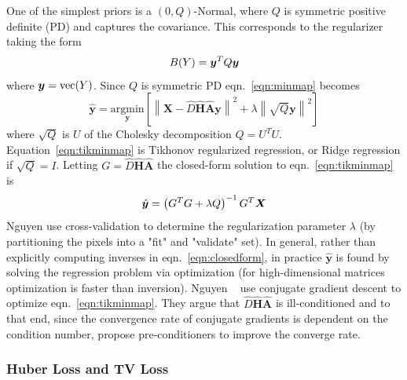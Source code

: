 One of the simplest priors is a $(0, Q)$-Normal, where $Q$ is symmetric positive definite (PD) and captures the covariance.
%
This corresponds to the regularizer taking the form
\begin{equation}
	B(Y) = \bm{y} ^T Q \bm{y}
\end{equation}
where $\bm{y} = \text{vec}(Y)$.
%
Since $Q$ is symmetric PD eqn.~\eqref{eqn:minmap} becomes
\begin{equation}
	\hat{\bm{y}} = \underset{\bm{y}}{\text{argmin}}\left[ \left\| \bm{X} - \hat{D} \hat{\bm{H}} \hat{\bm{A}} \bm{y} \right\|^2 +\lambda \left\| \sqrt{Q}\bm{y} \right\|^2 \right]
	\label{eqn:tikminmap}
\end{equation}
where $\sqrt{Q}$ is $U$ of the Cholesky decomposition $Q = U^T U$.
%
Equation~\ref{eqn:tikminmap} is Tikhonov regularized regression, or Ridge regression if $\sqrt{Q} = I$.
%
Letting $G = \hat{D} \hat{\bm{H}} \hat{\bm{A}}$ the closed-form solution to eqn.~\eqref{eqn:tikminmap} is
\begin{equation}
	\hat{\by} = \left( G^T G + \lambda Q \right)^{-1} G^T\bX
	\label{eqn:closedform}
\end{equation}
Nguyen \etal\cite{milanfar2001} use cross-validation to determine the regularization parameter $\lambda$ (by partitioning the pixels into a "fit" and "validate" set).
%
In general, rather than explicitly computing inverses in eqn.~\eqref{eqn:closedform}, in practice $\hat{\bm{y}}$ is found by solving the regression problem via optimization (for high-dimensional matrices optimization is faster than inversion).
%
Nguyen \etal~ use conjugate gradient descent to optimize eqn.~\eqref{eqn:tikminmap}.
%
They argue that $\hat{D} \hat{\bm{H}} \hat{\bm{A}}$ is ill-conditioned and to that end, since the convergence rate of conjugate gradients is dependent on the condition number\cite{vanderSluis1986}, propose pre-conditioners to improve the converge rate.

\subsubsection{Huber Loss and TV Loss}

